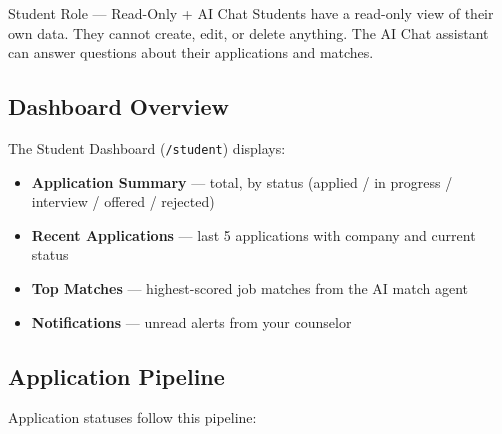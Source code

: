 \documentclass[11pt, a4paper]{article}
\begin{document}
\begin{rolebox}[studentcolor]{Student Role — Read-Only + AI Chat}
Students have a read-only view of their own data. They cannot create, edit, or delete anything. The AI Chat assistant can answer questions about their applications and matches.
\end{rolebox}

\subsection{Dashboard Overview}

The Student Dashboard (\texttt{/student}) displays:
\begin{itemize}
  \item \textbf{Application Summary} — total, by status (applied / in progress / interview / offered / rejected)
  \item \textbf{Recent Applications} — last 5 applications with company and current status
  \item \textbf{Top Matches} — highest-scored job matches from the AI match agent
  \item \textbf{Notifications} — unread alerts from your counselor
\end{itemize}

\subsection{Application Pipeline}

Application statuses follow this pipeline:

\begin{center}
\end{center}
\end{document}
